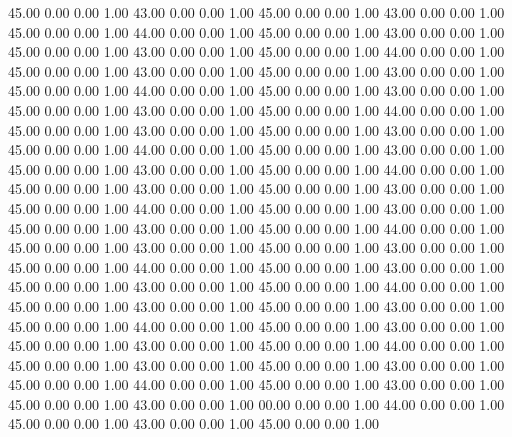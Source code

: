    45.00   0.00   0.00   1.00
   43.00   0.00   0.00   1.00
   45.00   0.00   0.00   1.00
   43.00   0.00   0.00   1.00
   45.00   0.00   0.00   1.00
   44.00   0.00   0.00   1.00
   45.00   0.00   0.00   1.00
   43.00   0.00   0.00   1.00
   45.00   0.00   0.00   1.00
   43.00   0.00   0.00   1.00
   45.00   0.00   0.00   1.00
   44.00   0.00   0.00   1.00
   45.00   0.00   0.00   1.00
   43.00   0.00   0.00   1.00
   45.00   0.00   0.00   1.00
   43.00   0.00   0.00   1.00
   45.00   0.00   0.00   1.00
   44.00   0.00   0.00   1.00
   45.00   0.00   0.00   1.00
   43.00   0.00   0.00   1.00
   45.00   0.00   0.00   1.00
   43.00   0.00   0.00   1.00
   45.00   0.00   0.00   1.00
   44.00   0.00   0.00   1.00
   45.00   0.00   0.00   1.00
   43.00   0.00   0.00   1.00
   45.00   0.00   0.00   1.00
   43.00   0.00   0.00   1.00
   45.00   0.00   0.00   1.00
   44.00   0.00   0.00   1.00
   45.00   0.00   0.00   1.00
   43.00   0.00   0.00   1.00
   45.00   0.00   0.00   1.00
   43.00   0.00   0.00   1.00
   45.00   0.00   0.00   1.00
   44.00   0.00   0.00   1.00
   45.00   0.00   0.00   1.00
   43.00   0.00   0.00   1.00
   45.00   0.00   0.00   1.00
   43.00   0.00   0.00   1.00
   45.00   0.00   0.00   1.00
   44.00   0.00   0.00   1.00
   45.00   0.00   0.00   1.00
   43.00   0.00   0.00   1.00
   45.00   0.00   0.00   1.00
   43.00   0.00   0.00   1.00
   45.00   0.00   0.00   1.00
   44.00   0.00   0.00   1.00
   45.00   0.00   0.00   1.00
   43.00   0.00   0.00   1.00
   45.00   0.00   0.00   1.00
   43.00   0.00   0.00   1.00
   45.00   0.00   0.00   1.00
   44.00   0.00   0.00   1.00
   45.00   0.00   0.00   1.00
   43.00   0.00   0.00   1.00
   45.00   0.00   0.00   1.00
   43.00   0.00   0.00   1.00
   45.00   0.00   0.00   1.00
   44.00   0.00   0.00   1.00
   45.00   0.00   0.00   1.00
   43.00   0.00   0.00   1.00
   45.00   0.00   0.00   1.00
   43.00   0.00   0.00   1.00
   45.00   0.00   0.00   1.00
   44.00   0.00   0.00   1.00
   45.00   0.00   0.00   1.00
   43.00   0.00   0.00   1.00
   45.00   0.00   0.00   1.00
   43.00   0.00   0.00   1.00
   45.00   0.00   0.00   1.00
   44.00   0.00   0.00   1.00
   45.00   0.00   0.00   1.00
   43.00   0.00   0.00   1.00
   45.00   0.00   0.00   1.00
   43.00   0.00   0.00   1.00
   45.00   0.00   0.00   1.00
   44.00   0.00   0.00   1.00
   45.00   0.00   0.00   1.00
   43.00   0.00   0.00   1.00
   45.00   0.00   0.00   1.00
   43.00   0.00   0.00   1.00
   00.00   0.00   0.00   1.00
   44.00   0.00   0.00   1.00
   45.00   0.00   0.00   1.00
   43.00   0.00   0.00   1.00
   45.00   0.00   0.00   1.00
